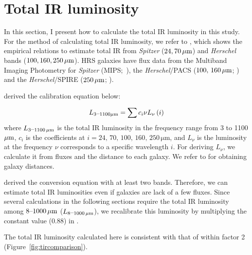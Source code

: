\section{Total IR luminosity}\label{sec:tirluminosity}
In this section, I present how to calculate the total IR luminosity in this study.
For the method of calculating total IR luminosity, we refer to \citet{Galametz2013}, which shows the empirical relations to estimate total IR from {\it Spitzer\/} ($24, 70\,\mathrm{\mu m}$) and {\it Herschel\/} bands ($100, 160, 250\,\mathrm{\mu m}$).
HRS galaxies have flux data from the Multiband Imaging Photometry for {\it Spitzer\/} (MIPS;~\citealt{Rieke2004, Bendo2012}), the {\it Herschel\/}/PACS ($100,\,160\,\mathrm{\mu m}$; \citealt{Cortese2014c}) and the {\it Herschel\/}/SPIRE ($250\,\mathrm{\mu m}$; \citealt{Ciesla2012a}).

\citet{Galametz2013} derived the calibration equation below:

\begin{equation}\label{eq:galametz}
    L_{\mathrm{3\mbox{--}1100\mathrm{\mu m}}} = \sum c_i \nu L_{\nu}\left(i\right)
\end{equation}
where $L_{\mathrm{3\mbox{--}1100\,\mu m}}$ is the total IR luminosity in the frequency range from 3 to 1100 $\mathrm{\mu m}$, $c_i$ is the coefficients at $i = 24,\,70,\,100,\,160,\,250\,\mathrm{\mu m}$, and $L_{\nu}$ is the luminosity at the frequency $\nu$ corresponds to a specific wavelength $i$.
For deriving $L_{\nu}$, we calculate it from fluxes and the distance to each galaxy.
We refer to \citet{Cortese2012} for obtaining galaxy distances.

\citet{Galametz2013} derived the conversion equation with at least two bands.
Therefore, we can estimate total IR luminosities even if galaxies are lack of a few fluxes.
Since several calculations in the following sections require the total IR luminosity among $8 \mbox{--} 1000\,\mathrm{\mu m}$ ($L_{\mathrm{8\mbox{--}1000\,\mathrm{\mu m}}}$), we recalibrate this luminosity by multiplying the constant value (0.88) in \citet{Takeuchi2005}.

The total IR luminosity calculated here is consistent with that of \citet{Ciesla2014} within factor 2 (Figure~\ref{fig:tircomparison}).

